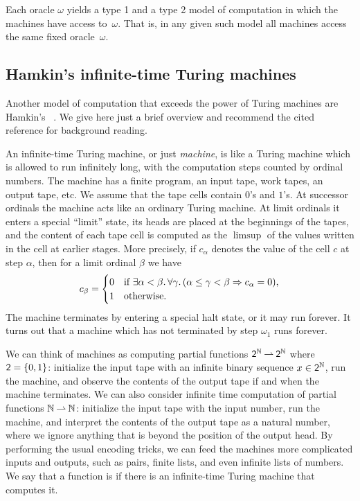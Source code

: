 Each oracle $\omega$ yields a type 1 and a type 2 model of computation in which the machines have access to~$\omega$. That is, in any given such model all machines access the same fixed oracle~$\omega$.


\subsection{Hamkin's infinite-time Turing machines}
\label{sec:iitm}

Another model of computation that exceeds the power of Turing machines are Hamkin's ~. We give here just a brief overview and recommend the cited reference for background reading.

An infinite-time Turing machine, or just \emph{machine}, is like a Turing
machine which is allowed to run infinitely long, with the computation steps
counted by ordinal numbers. The machine has a finite program, an input tape, work
tapes, an output tape, etc. We assume that the tape cells contain $0$'s and
$1$'s. At successor ordinals the machine acts like an ordinary Turing machine.
At limit ordinals it enters a special ``limit'' state, its heads are placed at
the beginnings of the tapes, and the content of each tape cell is computed as
the $\limsup$ of the values written in the cell at earlier stages. More
precisely, if $c_\alpha$ denotes the value of the cell $c$ at step $\alpha$,
then for a limit ordinal $\beta$ we have
%
\begin{equation*}
  c_\beta =
  \begin{cases}
    0 & \text{if $\exists \alpha < \beta .\, \forall \gamma .\,
      (\alpha \leq \gamma < \beta \Rightarrow c_\alpha = 0)$},\\
    1 & \text{otherwise}.
  \end{cases}
\end{equation*}
%
The machine terminates by entering a special halt state, or it may run forever. It turns
out that a machine which has not terminated by step $\omega_1$ runs forever.

We can think of machines as computing partial functions $\mathsf{2}^{\mathbb{N}} \mathbin{\rightharpoonup} \mathsf{2}^{\mathbb{N}}$ where $\mathsf{2} = \{0, 1\}$:
%
initialize the input tape with an infinite binary sequence $x \in \mathsf{2}^{\mathbb{N}}$, run the
machine, and observe the contents of the output tape if and when the machine terminates.
We can also consider infinite time computation of partial functions $\mathbb{N} \mathbin{\rightharpoonup} \mathbb{N}$:
initialize the input tape with the input number, run the machine, and interpret the
contents of the output tape as a natural number, where we ignore anything that is beyond
the position of the output head. By performing the usual encoding tricks, we can feed the
machines more complicated inputs and outputs, such as pairs, finite lists, and even
infinite lists of numbers. We say that a function is  if there is an infinite-time Turing machine that computes it.

